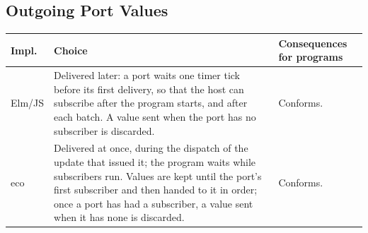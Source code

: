 \subsection{Outgoing Port Values}
\begin{center}\small
\begin{tabular}{@{}>{\raggedright\arraybackslash}p{}>{\raggedright\arraybackslash}p{}>{\raggedright\arraybackslash}p{}@{}}
\hline
Impl. & Choice & Consequences for programs\\
\hline
Elm/JS & Delivered later: a port waits one timer tick before its first
delivery, so that the host can subscribe after the program starts, and after
each batch. A value sent when the port has no subscriber is discarded. &
Conforms.\\
eco & Delivered at once, during the dispatch of the update that issued it; the
program waits while subscribers run. Values are kept until the port's first
subscriber and then handed to it in order; once a port has had a subscriber,
a value sent when it has none is discarded. &
Conforms.\\
\hline
\end{tabular}
\end{center}

